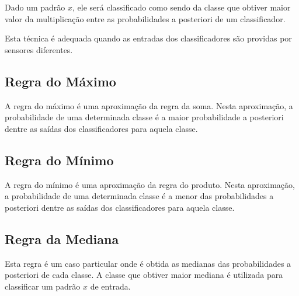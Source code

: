 Dado um padrão $x$, ele será classificado como sendo da classe que obtiver maior valor da multiplicação entre as probabilidades a posteriori de um classificador.

Esta técnica é adequada quando as entradas dos classificadores são providas por sensores diferentes.

\subsection{Regra do Máximo}
\label{subsubsec:regradomaximo}

A regra do máximo é uma aproximação da regra da soma. Nesta aproximação, a probabilidade de uma determinada classe é a maior probabilidade a posteriori dentre as saídas dos classificadores para aquela classe.

\subsection{Regra do Mínimo}
\label{subsubsec:regradominimo}

A regra do mínimo é uma aproximação da regra do produto. Nesta aproximação, a probabilidade de uma determinada classe é a menor das probabilidades a posteriori dentre as saídas dos classificadores para aquela classe.


\subsection{Regra da Mediana}
\label{subsubsec:regradamediana}

Esta regra é um caso particular onde é obtida as medianas das probabilidades a posteriori de cada classe. A classe que obtiver maior mediana é utilizada para classificar um padrão $x$ de entrada.




